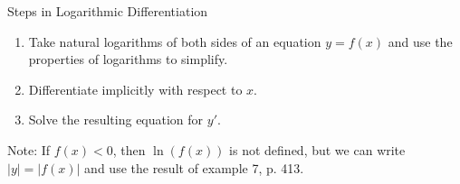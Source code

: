 \begin{frame}
Steps in Logarithmic Differentiation
\begin{enumerate}
\item  Take natural logarithms of both sides of an equation $y = f(x)$ and use the properties of logarithms to simplify.
\item  Differentiate implicitly with respect to $x$.
\item  Solve the resulting equation for $y'$.
\end{enumerate}
Note: If $f(x) < 0$, then $\ln (f(x))$ is not defined, but we can write $|y| = |f(x)|$ and use the result of example 7, p. 413.
\end{frame}
